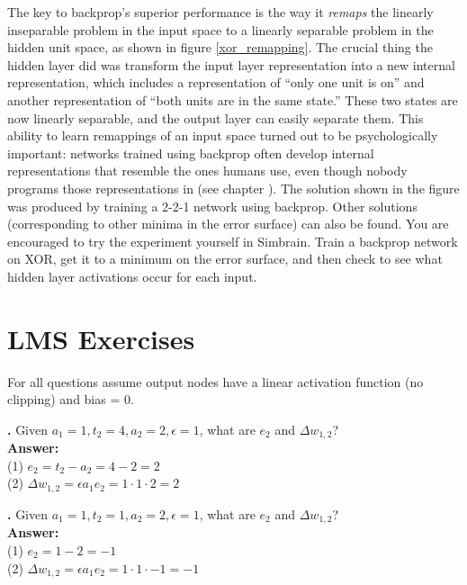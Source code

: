 The key to backprop's superior performance is the way it \emph{remaps} the linearly inseparable problem in the input space to a linearly separable problem in the hidden unit space, as shown in figure \ref{xor_remapping}. The crucial thing the hidden layer did was transform the input layer representation into a new internal representation, which includes a representation of ``only one unit is on'' and another representation of ``both units are in the same state.''  These two states are now linearly separable, and the output layer can easily separate them. This ability to learn remappings of an input space turned out to be psychologically important: networks trained using backprop often develop internal representations that resemble the ones humans use, even though nobody programs those representations in (see chapter ). The solution shown in the figure was produced by training a 2-2-1 network using backprop. Other solutions (corresponding to other minima in the error surface) can also be found. You are encouraged to try the experiment yourself in Simbrain. Train a backprop network on XOR, get it to a minimum on the error surface, and then check to see what hidden layer activations occur for each input.

\newpage

\section{LMS Exercises}


For all questions assume output nodes have a linear activation function (no clipping) and bias = 0.


\noindent
{}
{\bf \theLMSCounter.}  Given $a_1 = 1, t_2 = 4, a_2 = 2, \epsilon = 1$, what are $e_2$ and $\Delta w_{1,2}$? \\
{\bf Answer:}  \\
(1) $e_2 = t_2 - a_2 = 4 - 2  = 2 $ \\
(2) $\Delta w_{1,2} = \epsilon a_1 e_2 = 1 \cdot 1 \cdot  2 = 2$
\bigskip

\noindent
{}
{\bf \theLMSCounter.}  Given $a_1 = 1, t_2 = 1, a_2 = 2, \epsilon = 1$, what are $e_2$ and $\Delta w_{1,2}$? \\
{\bf Answer:}  \\
(1) $e_2 = 1 - 2  = -1 $ \\
(2) $\Delta w_{1,2} = \epsilon a_1 e_2 = 1 \cdot 1 \cdot  -1 = -1$
\bigskip

